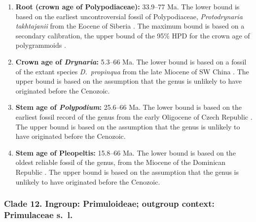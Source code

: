 \documentclass[10pt]{article}
\begin{document}
\begin{enumerate}
\item \textbf{Root (crown age of Polypodiaceae):} 33.9--77 Ma. The
  lower bound is based on the earliest uncontroversial fossil of
  Polypodiaceae, \textit{Protodrynaria takhtajanii} from the Eocene of
  Siberia \citep{Vikulin1987}. The maximum bound is based on a
  secondary calibration, the upper bound of the 95\% HPD for the crown
  age of polygrammoids \citep{Schuettpelz2009}.

\item \textbf{Crown age of \textit{Drynaria}:} 5.3--66 Ma. The lower
  bound is based on a fossil of the extant species
  \textit{D.~propinqua} from the late Miocene of SW China
  \citep{Wen2013}. The upper bound is based on the assumption that the
  genus is unlikely to have originated before the Cenozoic.

\item \textbf{Stem age of \textit{Polypodium}:} 25.6--66 Ma. The
  lower bound is based on the earliest fossil record of the genus
  from the early Oligocene of Czech Republic \citep{Kvacek2001}. The
  upper bound is based on the assumption that the genus is unlikely to
  have originated before the Cenozoic.

\item \textbf{Stem age of Pleopeltis:} 15.8--66 Ma. The lower bound
  is based on the oldest reliable fossil of the genus, from the
  Miocene of the Dominican Republic \citep{Schneider2015}. The upper
  bound is based on the assumption that the genus is unlikely to have
  originated before the Cenozoic.
\end{enumerate}

\subsubsection*{Clade 12. Ingroup: Primuloideae; outgroup context:
  Primulaceae s.~l.}

\end{document}
